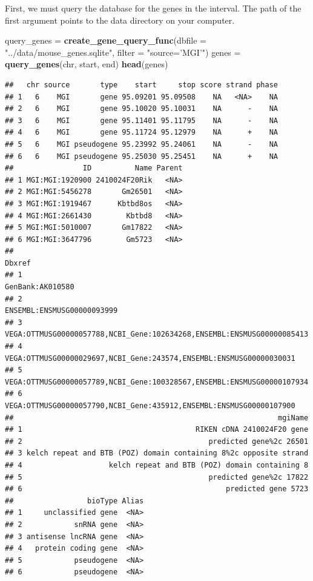 \documentclass[]{article}
\newenvironment{Shaded}{\begin{snugshade}}{\end{snugshade}}
\newcommand{\KeywordTok}[1]{\textcolor[rgb]{0.13,0.29,0.53}{\textbf{#1}}}
\newcommand{\DataTypeTok}[1]{\textcolor[rgb]{0.13,0.29,0.53}{#1}}
\newcommand{\StringTok}[1]{\textcolor[rgb]{0.31,0.60,0.02}{#1}}
\newcommand{\NormalTok}[1]{#1}
\begin{document}
First, we must query the database for the genes in the interval. The
path of the first argument points to the data directory on your
computer.

\begin{Shaded}
\begin{Highlighting}[]
\NormalTok{query_genes =}\StringTok{ }\KeywordTok{create_gene_query_func}\NormalTok{(}\DataTypeTok{dbfile =} \StringTok{"../data/mouse_genes.sqlite"}\NormalTok{, }\DataTypeTok{filter =} \StringTok{"source='MGI'"}\NormalTok{)}
\NormalTok{genes =}\StringTok{ }\KeywordTok{query_genes}\NormalTok{(chr, start, end)}
\KeywordTok{head}\NormalTok{(genes)}
\end{Highlighting}
\end{Shaded}

\begin{verbatim}
##   chr source       type    start     stop score strand phase
## 1   6    MGI       gene 95.09201 95.09508    NA   <NA>    NA
## 2   6    MGI       gene 95.10020 95.10031    NA      -    NA
## 3   6    MGI       gene 95.11401 95.11795    NA      -    NA
## 4   6    MGI       gene 95.11724 95.12979    NA      +    NA
## 5   6    MGI pseudogene 95.23992 95.24061    NA      -    NA
## 6   6    MGI pseudogene 95.25030 95.25451    NA      +    NA
##                ID          Name Parent
## 1 MGI:MGI:1920900 2410024F20Rik   <NA>
## 2 MGI:MGI:5456278       Gm26501   <NA>
## 3 MGI:MGI:1919467      Kbtbd8os   <NA>
## 4 MGI:MGI:2661430        Kbtbd8   <NA>
## 5 MGI:MGI:5010007       Gm17822   <NA>
## 6 MGI:MGI:3647796        Gm5723   <NA>
##                                                                   Dbxref
## 1                                                       GenBank:AK010580
## 2                                             ENSEMBL:ENSMUSG00000093999
## 3 VEGA:OTTMUSG00000057788,NCBI_Gene:102634268,ENSEMBL:ENSMUSG00000085413
## 4    VEGA:OTTMUSG00000029697,NCBI_Gene:243574,ENSEMBL:ENSMUSG00000030031
## 5 VEGA:OTTMUSG00000057789,NCBI_Gene:100328567,ENSEMBL:ENSMUSG00000107934
## 6    VEGA:OTTMUSG00000057790,NCBI_Gene:435912,ENSEMBL:ENSMUSG00000107900
##                                                             mgiName
## 1                                        RIKEN cDNA 2410024F20 gene
## 2                                           predicted gene%2c 26501
## 3 kelch repeat and BTB (POZ) domain containing 8%2c opposite strand
## 4                    kelch repeat and BTB (POZ) domain containing 8
## 5                                           predicted gene%2c 17822
## 6                                               predicted gene 5723
##                 bioType Alias
## 1     unclassified gene  <NA>
## 2            snRNA gene  <NA>
## 3 antisense lncRNA gene  <NA>
## 4   protein coding gene  <NA>
## 5            pseudogene  <NA>
## 6            pseudogene  <NA>
\end{verbatim}
\end{document}

